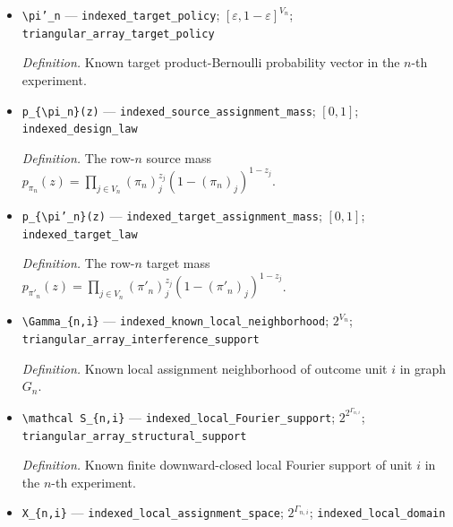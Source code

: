 \documentclass{article}
\begin{document}
\begin{itemize}
  \par\smallskip\noindent\emph{Definition.} Known source product-Bernoulli probability vector in the \(n\)-th experiment.
  \item \texttt{\textbackslash{}\allowbreak{}pi'\_\allowbreak{}n} --- \texttt{indexed\_\allowbreak{}target\_\allowbreak{}policy}; \([\varepsilon,1-\varepsilon]^{V_n}\); \texttt{triangular\_\allowbreak{}array\_\allowbreak{}target\_\allowbreak{}policy}
  \par\smallskip\noindent\emph{Definition.} Known target product-Bernoulli probability vector in the \(n\)-th experiment.
  \item \texttt{p\_\allowbreak{}\{\textbackslash{}\allowbreak{}pi\_\allowbreak{}n\}\allowbreak{}(z)} --- \texttt{indexed\_\allowbreak{}source\_\allowbreak{}assignment\_\allowbreak{}mass}; \([0,1]\); \texttt{indexed\_\allowbreak{}design\_\allowbreak{}law}
  \par\smallskip\noindent\emph{Definition.} The row-\(n\) source mass \(p_{\pi_n}(z)=\prod_{j\in V_n}(\pi_n)_j^{z_j}(1-(\pi_n)_j)^{1-z_j}\).
  \item \texttt{p\_\allowbreak{}\{\textbackslash{}\allowbreak{}pi'\_\allowbreak{}n\}\allowbreak{}(z)} --- \texttt{indexed\_\allowbreak{}target\_\allowbreak{}assignment\_\allowbreak{}mass}; \([0,1]\); \texttt{indexed\_\allowbreak{}target\_\allowbreak{}law}
  \par\smallskip\noindent\emph{Definition.} The row-\(n\) target mass \(p_{\pi'_n}(z)=\prod_{j\in V_n}(\pi'_n)_j^{z_j}(1-(\pi'_n)_j)^{1-z_j}\).
  \item \texttt{\textbackslash{}\allowbreak{}Gamma\_\allowbreak{}\{n,\allowbreak{}i\}\allowbreak{}} --- \texttt{indexed\_\allowbreak{}known\_\allowbreak{}local\_\allowbreak{}neighborhood}; \(2^{V_n}\); \texttt{triangular\_\allowbreak{}array\_\allowbreak{}interference\_\allowbreak{}support}
  \par\smallskip\noindent\emph{Definition.} Known local assignment neighborhood of outcome unit \(i\) in graph \(G_n\).
  \item \texttt{\textbackslash{}\allowbreak{}mathcal S\_\allowbreak{}\{n,\allowbreak{}i\}\allowbreak{}} --- \texttt{indexed\_\allowbreak{}local\_\allowbreak{}Fourier\_\allowbreak{}support}; \(2^{2^{\Gamma_{n,i}}}\); \texttt{triangular\_\allowbreak{}array\_\allowbreak{}structural\_\allowbreak{}support}
  \par\smallskip\noindent\emph{Definition.} Known finite downward-closed local Fourier support of unit \(i\) in the \(n\)-th experiment.
  \item \texttt{X\_\allowbreak{}\{n,\allowbreak{}i\}\allowbreak{}} --- \texttt{indexed\_\allowbreak{}local\_\allowbreak{}assignment\_\allowbreak{}space}; \(2^{\Gamma_{n,i}}\); \texttt{indexed\_\allowbreak{}local\_\allowbreak{}domain}

\end{itemize}
\end{document}
